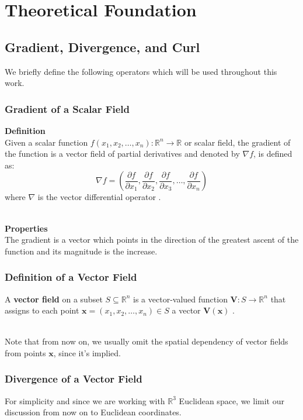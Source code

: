 \documentclass[main]{subfiles}
\begin{document}
\section{Theoretical Foundation}

\subsection{Gradient, Divergence, and Curl} \label{Gradient, Divergence, and Curl}
We briefly define the following operators which will be used throughout this 
work.

\subsubsection{Gradient of a Scalar Field}
\textbf{Definition}\noindent\\
Given a scalar function \( f(x_1, x_2, \ldots, x_n): \mathbb{R}^n \to \mathbb{R} 
\) or scalar field, the gradient of the function is a vector field of partial 
derivatives and denoted by \( \nabla f \), is defined as:
\begin{equation}
\nabla f = \left( \frac{\partial f}{\partial x_1}, \frac{\partial f}{\partial 
x_2}, \frac{\partial f}{\partial x_3}, \ldots, \frac{\partial f}{\partial x_n} 
\right)
\label{eq:gradient}
\end{equation}
where \( \nabla \) is the vector differential operator \cite{math-book}.

\noindent\\
\textbf{Properties}\noindent\\
The gradient is a vector which points in the direction of the greatest ascent of 
the function and its magnitude is the increase.

\subsubsection{Definition of a Vector Field}
A \textbf{vector field} on a subset \(S \subseteq \mathbb{R}^n\) is a 
vector-valued function \(\mathbf{V}: S \to \mathbb{R}^n\) that assigns to each 
point \(\mathbf{x} = (x_1, x_2, \ldots, x_n) \in S\) a vector 
\(\mathbf{V}(\mathbf{x})\) \cite{math-book}.

\noindent\\
Note that from now on, we usually omit the spatial dependency of vector fields
from points $\mathbf{x}$, since it's implied.

\subsubsection{Divergence of a Vector Field}
For simplicity and since we are working with \(\mathbb{R}^3\) Euclidean space, we 
limit our discussion from now on to Euclidean coordinates.
\end{document}
